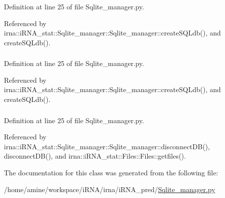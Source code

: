 \-Definition at line 25 of file \-Sqlite\-\_\-manager.\-py.



\-Referenced by irna\-::i\-R\-N\-A\-\_\-stat\-::\-Sqlite\-\_\-manager\-::\-Sqlite\-\_\-manager\-::create\-S\-Q\-Ldb(), and create\-S\-Q\-Ldb().

\hypertarget{classirna_1_1iRNA__pred_1_1Sqlite__manager_1_1Sqlite__manager_a2b57feee9cdabf2ea396ff827737c3fe}{
\subsubsection[{db\-\_\-path}]{}}
\label{classirna_1_1iRNA__pred_1_1Sqlite__manager_1_1Sqlite__manager_a2b57feee9cdabf2ea396ff827737c3fe}


\-Definition at line 25 of file \-Sqlite\-\_\-manager.\-py.



\-Referenced by irna\-::i\-R\-N\-A\-\_\-stat\-::\-Sqlite\-\_\-manager\-::\-Sqlite\-\_\-manager\-::create\-S\-Q\-Ldb(), and create\-S\-Q\-Ldb().

\hypertarget{classirna_1_1iRNA__pred_1_1Sqlite__manager_1_1Sqlite__manager_ad637e4dc91f2eaa43ddfe25d1236a775}{
\subsubsection[{fastmode}]{}}
\label{classirna_1_1iRNA__pred_1_1Sqlite__manager_1_1Sqlite__manager_ad637e4dc91f2eaa43ddfe25d1236a775}


\-Definition at line 25 of file \-Sqlite\-\_\-manager.\-py.



\-Referenced by irna\-::i\-R\-N\-A\-\_\-stat\-::\-Sqlite\-\_\-manager\-::\-Sqlite\-\_\-manager\-::disconnect\-D\-B(), disconnect\-D\-B(), and irna\-::i\-R\-N\-A\-\_\-stat\-::\-Files\-::\-Files\-::getfiles().



\-The documentation for this class was generated from the following file\-:\begin{DoxyCompactItemize}
\item 
/home/amine/workspace/i\-R\-N\-A/irna/i\-R\-N\-A\-\_\-pred/\hyperlink{iRNA__pred_2Sqlite__manager_8py}{\-Sqlite\-\_\-manager.\-py}\end{DoxyCompactItemize}
